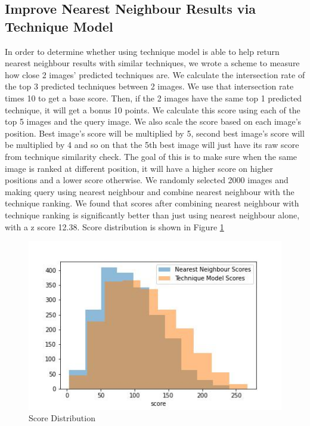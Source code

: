 \documentclass[10pt,twocolumn,letterpaper]{article}
\begin{document}
\subsection{Improve Nearest Neighbour Results via Technique Model}
In order to determine whether using technique model is able to help return nearest neighbour results with similar techniques, we wrote a scheme to measure how close 2 images’ predicted techniques are. We calculate the intersection rate of the top 3 predicted techniques between 2 images. We use that intersection rate times 10 to get a base score. Then, if the 2 images have the same top 1 predicted technique, it will get a bonus 10 points. We calculate this score using each of the top 5 images and the query image. We also scale the score based on each image’s position. Best image’s score will be multiplied by 5, second best image’s score will be multiplied by 4 and so on that the 5th best image will just have its raw score from technique similarity check. The goal of this is to make sure when the same image is ranked at different position, it will have a higher score on higher positions and a lower score otherwise.
We randomly selected 2000 images and making query using nearest neighbour and combine nearest neighbour with the technique ranking. We found that scores after combining nearest neighbour with technique ranking is significantly better than just using nearest neighbour alone, with a z score 12.38. Score distribution is shown in Figure \ref{fig:score_distribution}
\begin{figure}[t]
\begin{center}
\includegraphics[width=0.8\linewidth]{technique_model_improvment}
\end{center}
   \caption{Score Distribution}
\label{fig:score_distribution}
\end{figure}
\end{document}
